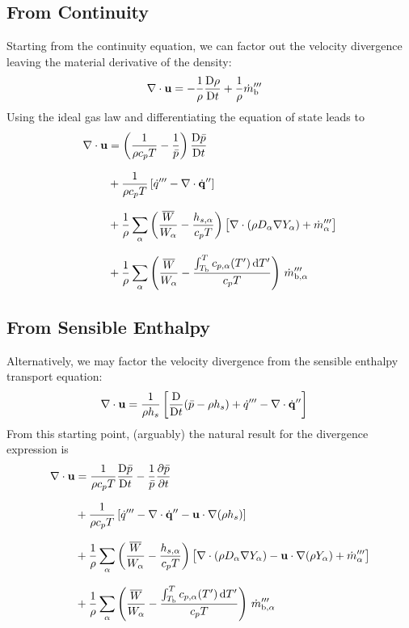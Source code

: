\subsection{From Continuity}
Starting from the continuity equation, we can factor out the velocity divergence leaving the material derivative of the density:
\begin{align}
\nabla\cdot\mathbf{u} &= -\frac{1}{\rho}\frac{\mbox{D}\rho}{\mbox{D} t} + \frac{1}{\rho} \dot{m}_{\rm b}'''
\end{align}
Using the ideal gas law and differentiating the equation of state leads to
\begin{align}
\label{eqn_div_1}
\nabla\cdot\mathbf{u} &= \left(\frac{1}{\rho c_p T} - \frac{1}{\bar{p}} \right)\frac{\mbox{D} \bar{p}}{\mbox{D} t} \notag\\[.1in]
&+ \frac{1}{\rho c_p T} \left[ \dot{q}^{\prime\prime\prime} - \nabla\cdot \dot{\mathbf{q}}^{\prime\prime} \right] \notag\\[.1in]
&+ \frac{1}{\rho} \sum_\alpha \left(\frac{\overline{W}}{W_\alpha} - \frac{h_{s,\alpha}}{c_p T} \right) \big[ \nabla\cdot (\rho D_\alpha \nabla Y_\alpha) + \dot{m}_\alpha^{\prime\prime\prime} \big] \notag \\[.1in]
&+ \frac{1}{\rho} \sum_\alpha \left(\frac{\overline{W}}{W_\alpha} - \frac{\int_{T_{\rm b}}^T c_{p,\alpha}(T') \, {\rm d}T'}{c_p T} \right) \, \dot{m}_{\rm b,\alpha}^{\prime\prime\prime}
\end{align}

\subsection{From Sensible Enthalpy}
Alternatively, we may factor the velocity divergence from the sensible enthalpy transport equation:
\begin{align}
\label{eqn_div_new}
\nabla\cdot\mathbf{u} &= \frac{1}{\rho h_s} \left[ \frac{\mbox{D}}{\mbox{D} t}(\bar{p}-\rho h_s) + \dot{q}^{\prime\prime\prime} - \nabla\cdot \dot{\mathbf{q}}^{\prime\prime} \right]
\end{align}
From this starting point, (arguably) the natural result for the divergence expression is
\begin{align}
\label{eqn_div_2}
\nabla\cdot\mathbf{u} &= \frac{1}{\rho c_p T}\frac{\mbox{D} \bar{p}}{\mbox{D} t} - \frac{1}{\bar{p}} \frac{\partial \bar{p}}{\partial t} \notag\\[.1in]
&+ \frac{1}{\rho c_p T}\left[ \dot{q}^{\prime\prime\prime} - \nabla\cdot \dot{\mathbf{q}}^{\prime\prime} - \mathbf{u} \cdot\nabla (\rho h_s) \right] \notag\\[.1in]
&+ \frac{1}{\rho} \sum_\alpha \left(\frac{\overline{W}}{W_\alpha} - \frac{h_{s,\alpha}}{c_p T} \right) \big[ \nabla\cdot (\rho D_\alpha \nabla Y_\alpha) - \mathbf{u} \cdot \nabla (\rho Y_\alpha) + \dot{m}_\alpha^{\prime\prime\prime} \big] \notag \\[.1in]
&+ \frac{1}{\rho} \sum_\alpha \left(\frac{\overline{W}}{W_\alpha} - \frac{\int_{T_{\rm b}}^T c_{p,\alpha}(T') \, {\rm d}T'}{c_p T} \right) \, \dot{m}_{\rm b,\alpha}^{\prime\prime\prime}
\end{align}

